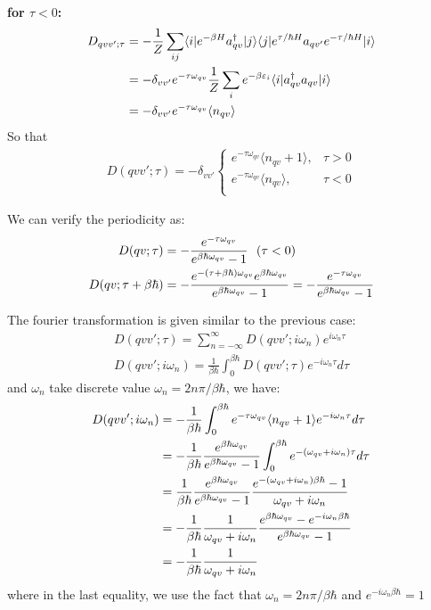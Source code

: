 \documentclass{article}
\begin{document}
\textbf{for $\tau < 0$:}
\begin{align}
    D_{qvv';\tau} &= -\frac{1}{Z} \sum_{ij} 
                    \langle i | e^{-\beta H} a^{\dagger}_{qv} | j \rangle \langle j | e^{\tau/\hbar H}a_{qv'}e^{-\tau/\hbar H} | i \rangle \notag \\
                  &= -\delta_{vv'} e^{-\tau\omega_{qv}} \frac{1}{Z} \sum_i e^{-\beta \varepsilon_i} \langle i | a^{\dagger}_{qv} a_{qv} | i\rangle \notag \\
                  &= -\delta_{vv'} e^{-\tau\omega_{qv}} \langle n_{qv} \rangle 
\end{align}
So that 
\begin{align}
    D(qvv';\tau) = -\delta_{vv'}
    \begin{cases}
        e^{-\tau\omega_{qv}} \langle n_{qv} + 1 \rangle, &\tau > 0 \\
        e^{-\tau\omega_{qv}} \langle n_{qv} \rangle , &\tau < 0 \\
    \end{cases}
\end{align}

We can verify the periodicity as:
\begin{align}
    D(qv;\tau) &= -\frac{e^{-\tau\omega_{qv}}}{e^{\beta\hbar\omega_{qv}}- 1} \ \ (\tau < 0) \notag \\
    D(qv;\tau+\beta\hbar) &= -\frac{e^{-(\tau+\beta\hbar)\omega_{qv}} e^{\beta\hbar\omega_{qv}}}{e^{\beta\hbar\omega_{qv}}- 1} 
                         = -\frac{e^{-\tau\omega_{qv}}}{e^{\beta\hbar\omega_{qv}}- 1} \notag
\end{align}

The fourier transformation is given similar to the previous case:
\begin{gather}
        D(qvv';\tau) = \sum_{n = - \infty}^{\infty} D(qvv';i\omega_n) e^{i\omega_n\tau} \\
        D(qvv';i\omega_n) = \frac{1}{\beta\hbar} \int_{0}^{\beta\hbar} D(qvv';\tau) e^{-i\omega_n\tau} d\tau
\end{gather}
and $\omega_n$ take discrete value $\omega_n = 2n\pi/\beta\hbar$, we have:
\begin{align}
    D(qvv';i\omega_n) &= -\frac{1}{\beta\hbar} \int_{0}^{\beta\hbar} e^{-\tau\omega_{qv}} \langle n_{qv} + 1 \rangle e^{-i\omega_n\tau} d\tau \notag \\
                    &= -\frac{1}{\beta\hbar} \frac{e^{\beta\hbar\omega_{qv}}}{e^{\beta\hbar\omega_{qv}}- 1} \int_0^{\beta\hbar} e^{-(\omega_{qv} + i\omega_n)\tau} d\tau \notag \\
                    &= \frac{1}{\beta\hbar} \frac{e^{\beta\hbar\omega_{qv}}}{e^{\beta\hbar\omega_{qv}}- 1} \frac{e^{-(\omega_{qv} + i\omega_n)\beta\hbar} - 1}{\omega_{qv} + i\omega_n} \notag \\
                    &= -\frac{1}{\beta\hbar} \frac{1}{\omega_{qv} + i\omega_n}\frac{e^{\beta\hbar\omega_{qv}}- e^{-i\omega_n \beta\hbar}}{e^{\beta\hbar\omega_{qv}}- 1}  \notag \\
                    &= -\frac{1}{\beta\hbar} \frac{1}{\omega_{qv} + i\omega_n}
\end{align}
where in the last equality, we use the fact that $\omega_n = 2n\pi/\beta\hbar$ and $e^{-i\omega_n \beta\hbar} = 1$
\end{document}
